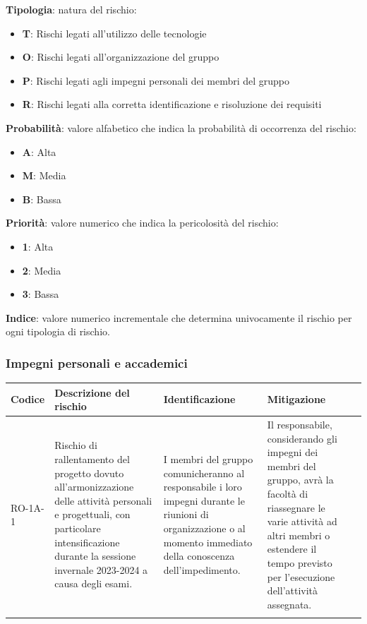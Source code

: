 \documentclass{article}
\begin{document}
\textbf{Tipologia}: natura del rischio:
\begin{itemize}
    \item \textbf{T}: Rischi legati all'utilizzo delle tecnologie
    \item \textbf{O}: Rischi legati all'organizzazione del gruppo
    \item \textbf{P}: Rischi legati agli impegni personali dei membri del gruppo
    \item \textbf{R}: Rischi legati alla corretta identificazione e risoluzione dei requisiti
\end{itemize}
\textbf{Probabilità}: valore alfabetico che indica la probabilità di occorrenza del rischio:
\begin{itemize}
    \item \textbf{A}: Alta
    \item \textbf{M}: Media
    \item \textbf{B}: Bassa
\end{itemize}
\textbf{Priorità}: valore numerico che indica la pericolosità del rischio:
\begin{itemize}
    \item \textbf{1}: Alta
    \item \textbf{2}: Media
    \item \textbf{3}: Bassa
\end{itemize}
\textbf{Indice}: valore numerico incrementale che determina univocamente il rischio per ogni tipologia di rischio. 


\subsubsection{Impegni personali e accademici}
\begin{table}[h]
    \centering
    \begin{tabularx}{\textwidth}{l>{\RaggedRight}X>{\RaggedRight}X>{\RaggedRight}X>{\RaggedRight}X}
    \toprule
    \rowcolor{gray!50}
    \textbf{Codice} & \textbf{Descrizione del rischio} & \textbf{Identificazione} & \textbf{Mitigazione} \\
    \midrule
    \addlinespace 
    RO-1A-1 & 
    Rischio di rallentamento del progetto dovuto all'armonizzazione delle attività personali e progettuali, con particolare intensificazione durante la sessione invernale 2023-2024 a causa degli esami. & 
    I membri del gruppo comunicheranno al responsabile i loro impegni durante le riunioni di organizzazione o al momento immediato della conoscenza dell'impedimento.& 
    Il responsabile, considerando gli impegni dei membri del gruppo, avrà la facoltà di riassegnare le varie attività ad altri membri o estendere il tempo previsto per l'esecuzione dell'attività assegnata. \\  
    \bottomrule
    \addlinespace 
    \end{tabularx}
\end{table}
\newpage
\end{document}
